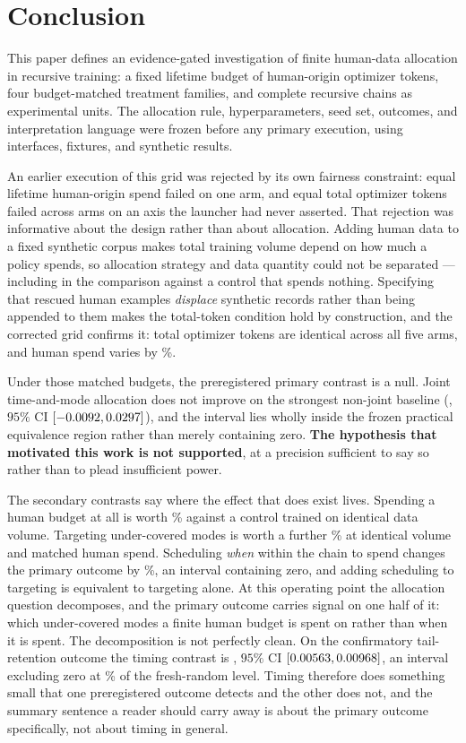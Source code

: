\section{Conclusion}
\label{sec:conclusion}

This paper defines an evidence-gated investigation of finite human-data allocation in
recursive training: a fixed lifetime budget of human-origin optimizer tokens, four
budget-matched treatment families, and complete recursive chains as experimental units. The
allocation rule, hyperparameters, seed set, outcomes, and interpretation language were
frozen before any primary execution, using interfaces, fixtures, and synthetic results.

An earlier execution of this grid was rejected by its own fairness constraint: equal
lifetime human-origin spend failed on one arm, and equal total optimizer tokens failed
across arms on an axis the launcher had never asserted. That rejection was informative
about the design rather than about allocation. Adding human data to a fixed synthetic
corpus makes total training volume depend on how much a policy spends, so allocation
strategy and data quantity could not be separated --- including in the comparison against a
control that spends nothing. Specifying that rescued human examples \emph{displace}
synthetic records rather than being appended to them makes the total-token condition hold
by construction, and the corrected grid confirms it: total optimizer tokens are identical
across all five arms, and human spend varies by \PilotHumanSpreadPct\%.

Under those matched budgets, the preregistered primary contrast is a null. Joint
time-and-mode allocation does not improve on the strongest non-joint baseline
(\PilotPrimaryMean{}, $95\%$ CI $[-0.0092, 0.0297]$), and the interval
lies wholly inside the frozen practical equivalence region rather than merely containing
zero. \textbf{The hypothesis that motivated this work is not supported}, at a precision
sufficient to say so rather than to plead insufficient power.

The secondary contrasts say where the effect that does exist lives. Spending a human budget
at all is worth \PilotRandNonePct\% against a control trained on identical data volume.
Targeting under-covered modes is worth a further \PilotSelRandPct\% at identical volume and
matched human spend. Scheduling \emph{when} within the chain to spend changes the primary
outcome by \PilotSchedRandPct\%, an interval containing zero, and adding scheduling to
targeting is equivalent to targeting alone. At this operating point the allocation question
decomposes, and the primary outcome carries signal on one half of it: which under-covered
modes a finite human budget is spent on rather than when it is spent. The decomposition is
not perfectly clean. On the confirmatory tail-retention outcome the timing contrast is
\PilotTailSchedRandMean{}, $95\%$ CI
$[0.00563, 0.00968]$, an interval excluding zero at
\PilotTailSchedRandPct\% of the fresh-random level. Timing therefore does something small
that one preregistered outcome detects and the other does not, and the summary sentence a
reader should carry away is about the primary outcome specifically, not about timing in
general.

